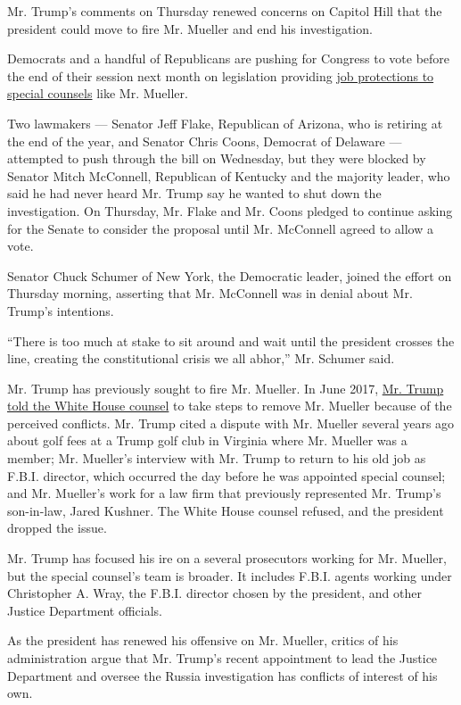 Mr. Trump's comments on Thursday renewed concerns on Capitol Hill that
the president could move to fire Mr. Mueller and end his investigation.

Democrats and a handful of Republicans are pushing for Congress to vote
before the end of their session next month on legislation providing
\href{https://www.nytimes.com/2018/04/19/us/politics/mueller-special-counsel-legislation-senate.html}{job
protections to special counsels} like Mr. Mueller.

Two lawmakers --- Senator Jeff Flake, Republican of Arizona, who is
retiring at the end of the year, and Senator Chris Coons, Democrat of
Delaware --- attempted to push through the bill on Wednesday, but they
were blocked by Senator Mitch McConnell, Republican of Kentucky and the
majority leader, who said he had never heard Mr. Trump say he wanted to
shut down the investigation. On Thursday, Mr. Flake and Mr. Coons
pledged to continue asking for the Senate to consider the proposal until
Mr. McConnell agreed to allow a vote.

Senator Chuck Schumer of New York, the Democratic leader, joined the
effort on Thursday morning, asserting that Mr. McConnell was in denial
about Mr. Trump's intentions.

``There is too much at stake to sit around and wait until the president
crosses the line, creating the constitutional crisis we all abhor,'' Mr.
Schumer said.

Mr. Trump has previously sought to fire Mr. Mueller. In June 2017,
\href{https://www.nytimes.com/2018/01/25/us/politics/trump-mueller-special-counsel-russia.html}{Mr.
Trump told the White House counsel} to take steps to remove Mr. Mueller
because of the perceived conflicts. Mr. Trump cited a dispute with Mr.
Mueller several years ago about golf fees at a Trump golf club in
Virginia where Mr. Mueller was a member; Mr. Mueller's interview with
Mr. Trump to return to his old job as F.B.I. director, which occurred
the day before he was appointed special counsel; and Mr. Mueller's work
for a law firm that previously represented Mr. Trump's son-in-law, Jared
Kushner. The White House counsel refused, and the president dropped the
issue.

Mr. Trump has focused his ire on a several prosecutors working for Mr.
Mueller, but the special counsel's team is broader. It includes F.B.I.
agents working under Christopher A. Wray, the F.B.I. director chosen by
the president, and other Justice Department officials.

As the president has renewed his offensive on Mr. Mueller, critics of
his administration argue that Mr. Trump's recent appointment to lead the
Justice Department and oversee the Russia investigation has conflicts of
interest of his own.


